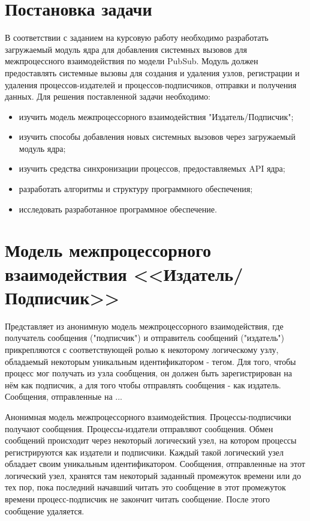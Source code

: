 \documentclass{bmstu}
\begin{document}
\section{Постановка задачи}
В соответствии с заданием на курсовую работу необходимо разработать загружаемый модуль ядра для добавления системных вызовов для межпроцессного взаимодействия по модели PubSub. Модуль должен предоставлять системные вызовы для создания и удаления узлов, %
 регистрации и удаления процессов-издателей и процессов-подписчиков, отправки и получения данных.
Для решения поставленной задачи необходимо:
\begin{itemize}
	\item изучить модель межпроцессорного взаимодействия "Издатель/Подписчик";
	\item изучить способы добавления новых системных вызовов через загружаемый модуль ядра;
	\item изучить средства синхронизации процессов, предоставляемых API ядра;
	\item разработать алгоритмы и структуру программного обеспечения;
	\item исследовать разработанное программное обеспечение.
\end{itemize}

\section{Модель межпроцессорного взаимодействия <<Издатель/Подписчик>>}
Представляет из анонимную модель межпроцессорного взаимодействия, где получатель сообщения ("подписчик") и отправитель сообщений ("издатель") прикрепляются с соответствующей ролью к некоторому логическому узлу, обладаемый некоторым уникальным идентификатором - тегом. Для того, чтобы процесс мог получать из узла сообщения, он должен быть зарегистрирован на нём как подписчик, а для того чтобы отправлять сообщения - как издатель. Сообщения, отправленные на ...

Анонимная модель межпроцессорного взаимодействия.
Процессы-подписчики получают сообщения.
Процессы-издатели отправляют сообщения.
Обмен сообщений происходит через некоторый логический узел, на котором процессы регистрируются как издатели и подписчики. Каждый такой логический узел обладает своим уникальным идентификатором.
Сообщения, отправленные на этот логический узел, хранятся там некоторый заданный промежуток времени или до тех пор, пока последний начавший читать это сообщение в этот промежуток времени процесс-подписчик не закончит читать сообщение. После этого сообщение удаляется.
\end{document}
